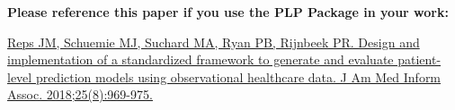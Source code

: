 \documentclass[
]{article}
\begin{document}
\textbf{Please reference this paper if you use the PLP Package in your
work:}

\href{http://dx.doi.org/10.1093/jamia/ocy032}{Reps JM, Schuemie MJ,
Suchard MA, Ryan PB, Rijnbeek PR. Design and implementation of a
standardized framework to generate and evaluate patient-level prediction
models using observational healthcare data. J Am Med Inform Assoc.
2018;25(8):969-975.}
\end{document}
